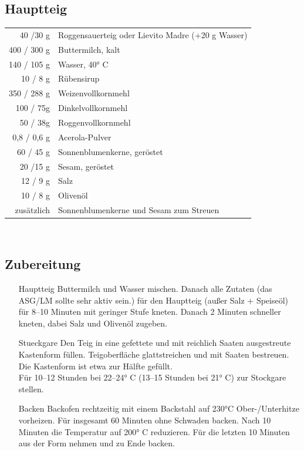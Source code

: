  
\subsection*{Hauptteig}
\begin{tabular}{r l}
          40 /30 g & Roggensauerteig oder Lievito Madre (+20 g Wasser) \\
         400 / 300 g & Buttermilch, kalt                                 \\
         140 / 105 g & Wasser, 40° C                                     \\
          10 / 8 g & Rübensirup                                        \\
         350 / 288 g & Weizenvollkornmehl                                \\
         100 / 75g & Dinkelvollkornmehl                                \\
          50 / 38g & Roggenvollkornmehl                                \\
         0,8 / 0,6 g & Acerola-Pulver                                    \\
          60 / 45 g & Sonnenblumenkerne, geröstet                       \\
          20 /15 g & Sesam, geröstet                                   \\
          12 / 9 g & Salz                                              \\
          10 / 8 g & Olivenöl                                          \\
    zusätzlich & Sonnenblumenkerne und Sesam zum Streuen
\end{tabular}\\

\subsection*{Zubereitung}

\begin{enumerate}
    \item [\Gls{Hauptteig}]  Buttermilch und Wasser mischen. Danach alle Zutaten (das ASG/LM sollte sehr aktiv sein.) für den Hauptteig (außer Salz + Speiseöl) für 8–10 Minuten mit geringer Stufe kneten. Danach 2 Minuten schneller kneten, dabei Salz und Olivenöl zugeben. 
    \item [\Gls{Stueckgare}] 
    Den Teig in eine gefettete und mit reichlich Saaten ausgestreute Kastenform füllen. Teigoberfläche glattstreichen und mit Saaten bestreuen. Die Kastenform ist etwa zur Hälfte gefüllt.\\
    Für 10–12 Stunden bei 22–24° C (13–15 Stunden bei 21° C) zur Stockgare stellen. 
    \item[\Gls{Backen}]
    Backofen rechtzeitig mit einem Backstahl auf 230°C Ober-/Unterhitze vorheizen. Für insgesamt 60 Minuten ohne Schwaden backen. Nach 10 Minuten die Temperatur auf 200° C reduzieren. Für die letzten 10 Minuten aus der Form nehmen und zu Ende backen.
\end{enumerate}

